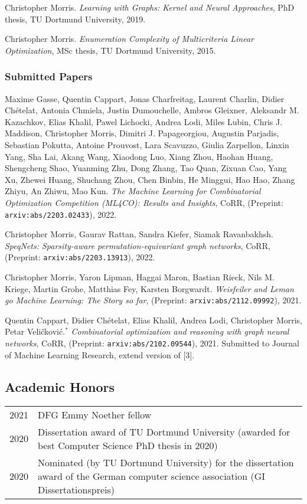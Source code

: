 \documentclass[11pt, a4paper, DIV=12]{scrartcl}
\begin{document}
\begin{thebibliography}{5}
Christopher Morris.
\emph{Learning with Graphs: Kernel and Neural Approaches}, PhD thesis, TU Dortmund University, 2019.

Christopher Morris.
\emph{Enumeration Complexity of Multicriteria Linear Optimization}, MSc thesis, TU Dortmund University, 2015.
	
\subsubsection*{Submitted Papers}


Maxime Gasse, Quentin Cappart, Jonas Charfreitag, Laurent Charlin, Didier Chételat, Antonia Chmiela, Justin Dumouchelle, Ambros Gleixner, Aleksandr M. Kazachkov, Elias Khalil, Pawel Lichocki, Andrea Lodi, Miles Lubin, Chris J. Maddison, Christopher Morris, Dimitri J. Papageorgiou, Augustin Parjadis, Sebastian Pokutta, Antoine Prouvost, Lara Scavuzzo, Giulia Zarpellon, Linxin Yang, Sha Lai, Akang Wang, Xiaodong Luo, Xiang Zhou, Haohan Huang, Shengcheng Shao, Yuanming Zhu, Dong Zhang, Tao Quan, Zixuan Cao, Yang Xu, Zhewei Huang, Shuchang Zhou, Chen Binbin, He Minggui, Hao Hao, Zhang Zhiyu, An Zhiwu, Mao Kun.
\emph{The Machine Learning for Combinatorial Optimization Competition (ML4CO): Results and Insights},
CoRR, (Preprint: \texttt{arxiv:abs/2203.02433}), 2022. 


Christopher Morris, Gaurav Rattan, Sandra Kiefer, Siamak Ravanbakhsh.
\emph{SpeqNets: Sparsity-aware permutation-equivariant graph networks},
CoRR, (Preprint: \texttt{arxiv:abs/2203.13913}), 2022. 


Christopher Morris, Yaron Lipman, Haggai Maron, Bastian Rieck, Nils M. Kriege, Martin Grohe, Matthias Fey, Karsten Borgwardt.
\emph{Weisfeiler and Leman go Machine Learning: The Story so far}, (Preprint: \texttt{arxiv:abs/2112.09992}), 2021. 

Quentin Cappart, Didier Chételat, Elias Khalil, Andrea Lodi, Christopher Morris, Petar Veli\v{c}kovi\'{c}.$^*$
\emph{Combinatorial optimization and reasoning with graph neural networks},
CoRR, (Preprint: \texttt{arxiv:abs/2102.09544}), 2021. Submitted to Journal of Machine Learning Research, extend version of [3].
\end{thebibliography}

\subsection*{Academic Honors}
\begin{tabular}{p{2.1cm}p{12.0cm}}
	2021& DFG Emmy Noether fellow\\
	2020& Dissertation award of TU Dortmund University (awarded for best Computer Science PhD thesis in 2020)\\
	2020& Nominated (by TU Dortmund University) for the dissertation award of the German computer science association (GI Dissertationspreis)\\
\end{tabular}
\end{document}
